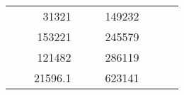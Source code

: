 \begin{table}[H]
\begin{tabular}{|ccrccrccc}
\multicolumn{1}{|c|}{\cellcolor[HTML]{FFFFC7}}                                & \multicolumn{1}{c|}{\cellcolor[HTML]{DDFDFF}}                      & \multicolumn{1}{r|}{\cellcolor[HTML]{DAE8FC}31321}     & \multicolumn{1}{c|}{\cellcolor[HTML]{FFFFC7}}                                & \multicolumn{1}{c|}{\cellcolor[HTML]{DDFDFF}}                       & \multicolumn{1}{r|}{\cellcolor[HTML]{DDFDFF}149232}    &                                                                              &                                                                    &                                                        \\ \cline{3-3} \cline{6-6}
\multicolumn{1}{|c|}{\cellcolor[HTML]{FFFFC7}}                                & \multicolumn{1}{c|}{\cellcolor[HTML]{DDFDFF}}                      & \multicolumn{1}{r|}{\cellcolor[HTML]{DDFDFF}153221}    & \multicolumn{1}{c|}{\cellcolor[HTML]{FFFFC7}}                                & \multicolumn{1}{c|}{\cellcolor[HTML]{DDFDFF}}                       & \multicolumn{1}{r|}{\cellcolor[HTML]{DAE8FC}245579}    &                                                                              &                                                                    &                                                        \\ \cline{3-3} \cline{6-6}
\multicolumn{1}{|c|}{\cellcolor[HTML]{FFFFC7}}                                & \multicolumn{1}{c|}{\cellcolor[HTML]{DDFDFF}}                      & \multicolumn{1}{r|}{\cellcolor[HTML]{DAE8FC}121482}    & \multicolumn{1}{c|}{\cellcolor[HTML]{FFFFC7}}                                & \multicolumn{1}{c|}{\cellcolor[HTML]{DDFDFF}}                       & \multicolumn{1}{r|}{\cellcolor[HTML]{DDFDFF}286119}    &                                                                              &                                                                    &                                                        \\ \cline{3-3} \cline{6-6}
\multicolumn{1}{|c|}{\cellcolor[HTML]{FFFFC7}}                                & \multicolumn{1}{c|}{\cellcolor[HTML]{DDFDFF}}                      & \multicolumn{1}{r|}{\cellcolor[HTML]{DDFDFF}21596.1}   & \multicolumn{1}{c|}{\cellcolor[HTML]{FFFFC7}}                                & \multicolumn{1}{c|}{\cellcolor[HTML]{DDFDFF}}                       & \multicolumn{1}{r|}{\cellcolor[HTML]{DAE8FC}623141}    &                                                                              &                                                                    &                                                        \\ \cline{3-3} \cline{6-6}

\end{tabular}
\end{table}
